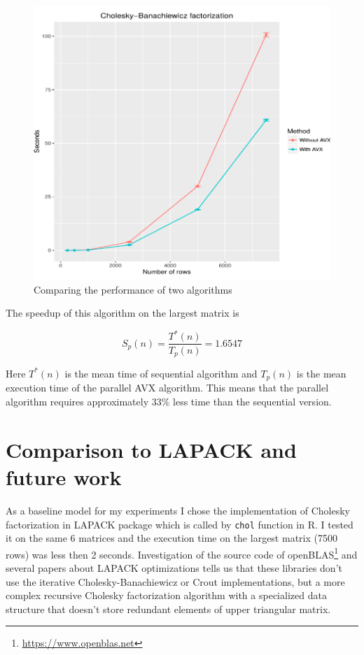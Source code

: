 \documentclass[sigplan]{acmart}
\begin{document}
\begin{figure}[H]
  \begin{center}
  \includegraphics[width=\linewidth]{img/experiment}
  \caption{Comparing the performance of two algorithms}
  \end{center}
\end{figure}

The speedup of this algorithm on the largest matrix is

\[ S_p(n) = \frac{T^{*}(n)}{T_p(n)} = 1.6547 \]

Here $T^{*}(n)$ is the mean time of sequential algorithm and $T_p(n)$ is the mean execution time of the parallel AVX algorithm. This means that the parallel algorithm requires approximately $33\%$ less time than the sequential version.

\section{Comparison to LAPACK and future work}

As a baseline model for my experiments I chose the implementation of Cholesky factorization in LAPACK package which is called by \texttt{chol} function in R. I tested it on the same 6 matrices and the execution time on the largest matrix (7500 rows) was less then 2 seconds. Investigation of the source code of openBLAS\footnote{\url{https://www.openblas.net}} and several papers about LAPACK optimizations\cite{Andersen-2001} tells us that these libraries don't use the iterative Cholesky-Banachiewicz or Crout implementations, but a more complex recursive Cholesky factorization algorithm with a specialized data structure that doesn't store redundant elements of upper triangular matrix.
\end{document}
